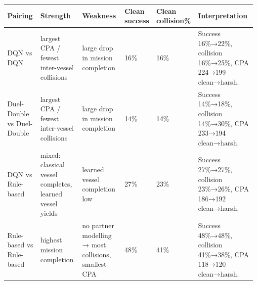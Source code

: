 \begin{tabular}{llllll}
\toprule
Pairing & Strength & Weakness & Clean success & Clean collision\% & Interpretation \\
\midrule
DQN vs DQN & largest CPA / fewest inter-vessel collisions & large drop in mission completion & 16\% & 16\% & Success 16\%→22\%, collision 16\%→25\%, CPA 224→199 clean→harsh. \\
Duel-Double vs Duel-Double & largest CPA / fewest inter-vessel collisions & large drop in mission completion & 14\% & 14\% & Success 14\%→18\%, collision 14\%→30\%, CPA 233→194 clean→harsh. \\
DQN vs Rule-based & mixed: classical vessel completes, learned vessel yields & learned vessel completion low & 27\% & 23\% & Success 27\%→27\%, collision 23\%→26\%, CPA 186→192 clean→harsh. \\
Rule-based vs Rule-based & highest mission completion & no partner modelling → most collisions, smallest CPA & 48\% & 41\% & Success 48\%→48\%, collision 41\%→38\%, CPA 118→120 clean→harsh. \\
\bottomrule
\end{tabular}
